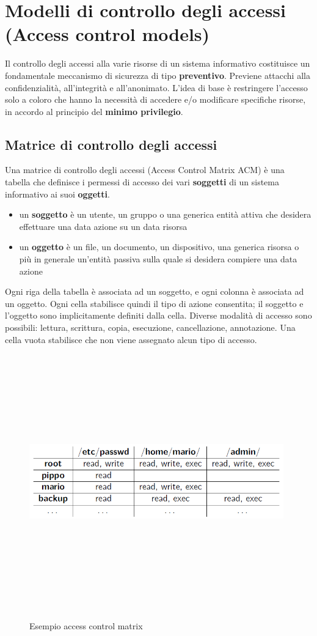 \section{Modelli di controllo degli accessi (Access control models)}
Il controllo degli accessi alla varie risorse di un sistema informativo costituisce un fondamentale meccanismo di sicurezza di tipo \textbf{preventivo}. Previene attacchi alla confidenzialità, all'integrità e all'anonimato. L'idea di base è restringere l’accesso solo a coloro che hanno la necessità di accedere e/o modificare specifiche risorse, in accordo al principio del \textbf{minimo privilegio}.

\subsection{Matrice di controllo degli accessi} 
Una matrice di controllo degli accessi (Access Control Matrix ACM) è una tabella che definisce i permessi di accesso dei vari \textbf{soggetti} di un sistema informativo ai suoi \textbf{oggetti}.
\begin{itemize} 
  \item un \textbf{soggetto} è un utente, un gruppo o una generica entità attiva che desidera effettuare una data azione su un data risorsa
  \item un \textbf{oggetto} è un file, un documento, un dispositivo, una generica risorsa o più in generale un'entità passiva sulla quale si desidera compiere una data azione
\end{itemize}

Ogni riga della tabella è associata ad un soggetto, e ogni colonna è associata ad un oggetto. Ogni cella stabilisce quindi il tipo di azione consentita; il soggetto e l'oggetto sono implicitamente definiti dalla cella. Diverse modalità di accesso sono possibili: lettura, scrittura, copia, esecuzione, cancellazione, annotazione. Una cella vuota stabilisce che non viene assegnato alcun tipo di accesso.
\begin{figure}[htbp]
	\centering%
	\subfigure%
	{\includegraphics[height=11cm, width=11cm, keepaspectratio]{Immagini/introduzione/access_control_matrix_ex.png}}
	\caption{Esempio access control matrix \label{fig:acm}} 	
\end{figure}

